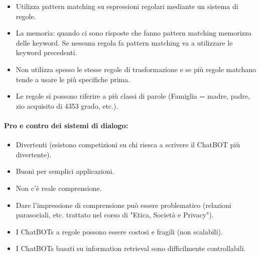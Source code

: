 \begin{itemize}
  \item Utilizza pattern matching su espressioni regolari mediante un sistema di regole. 
  \item La memoria: quando ci sono risposte che fanno pattern matching memorizza delle keyword. Se nessuna regola fa pattern matching va a utilizzare le keyword precedenti. 
  \item Non utilizza spesso le stesse regole di trasformazione e se più regole matchano tende a usare le più specifiche prima. 
  \item Le regole si possono riferire a più classi di parole (Famiglia = madre, padre, zio acquisito di 4353 grado, etc.). 
\end{itemize}

\paragraph{Pro e contro dei sistemi di dialogo:}

\begin{itemize}
  \item[\textcolor{green}{\ding{51}}] Divertenti (esistono competizioni su chi riesca a scrivere il ChatBOT più divertente). 
\item[\textcolor{green}{\ding{51}}] Buoni per semplici applicazioni.
  \item[\textcolor{red}{\ding{55}}] Non c'è reale comprensione. 
     \item[\textcolor{red}{\ding{55}}] Dare l'impressione di comprensione può essere problematico (relazioni parasociali, etc. trattato nel corso di "Etica, Società e Privacy"). 
        \item[\textcolor{red}{\ding{55}}] I ChatBOTs a regole possono essere costosi e fragili (non scalabili). 
           \item[\textcolor{red}{\ding{55}}] I ChatBOTs basati su information retrieval sono difficilmente controllabili.
\end{itemize}

